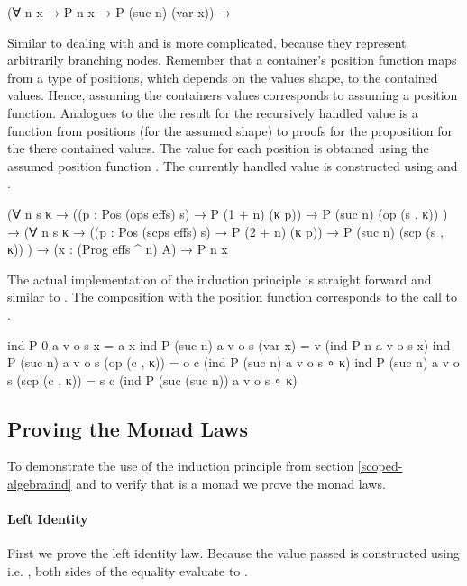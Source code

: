 \begin{AgdaAlign}
\begin{code}
  (∀ {n x} → P n x → P (suc n) (var x))  →
\end{code}
Similar to  dealing with  and
 is more complicated, because they represent
arbitrarily branching nodes.
Remember that a container's position function maps from a type of positions,
which depends on the values shape, to the contained values.
Hence, assuming the containers values corresponds to assuming a position
function.
Analogues to the  the result for the recursively handled value
is a function from positions (for the assumed shape) to proofs for the
proposition for the there contained values.
The value for each position is obtained using the assumed position function
.
The currently handled value is constructed using  and  
.
\begin{code}
  (∀ {n} s {κ}  →  ((p : Pos (ops   effs) s) → P (1 + n)  (κ p))  → P (suc n) (op   (s , κ))  )  →
  (∀ {n} s {κ}  →  ((p : Pos (scps  effs) s) → P (2 + n)  (κ p))  → P (suc n) (scp  (s , κ))  )  →
  (x : (Prog effs ^ n) A) → P n x
\end{code}
The actual implementation of the induction principle is straight forward and
similar to .
The composition with the position function corresponds to the call to
.
\begin{code}
ind P 0       a v o s x               = a x
ind P (suc n) a v o s (var x)         = v    (ind P n              a v o s x)
ind P (suc n) a v o s (op   (c , κ))  = o c  (ind P (suc n)        a v o s ∘ κ)
ind P (suc n) a v o s (scp  (c , κ))  = s c  (ind P (suc (suc n))  a v o s ∘ κ)
\end{code}
\end{AgdaAlign}


\subsection{Proving the Monad Laws}
\label{scoped-algebra:monad-laws}

To demonstrate the use of the induction principle from section
\ref{scoped-algebra:ind} and to verify that 
\AgdaSpace{}\AgdaSpace{}
is a monad we prove the monad laws.

\paragraph{Left Identity}
First we prove the left identity law.
Because the value passed \AgdaFunction{>>=} is constructed using
 i.e. , both sides of the
equality evaluate to \AgdaSpace{}.

